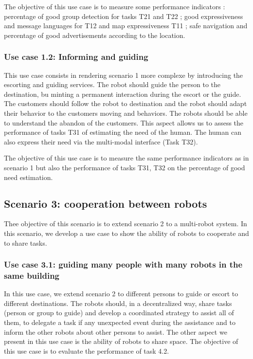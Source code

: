 The objective of this use case is to measure some performance indicators : percentage of good group detection for tasks T21 and T22 ; good expressiveness and message languages for T12 and map expressiveness T11 ; safe navigation and percentage of good advertisements according to the location. 

\subsubsection {Use case 1.2: Informing and guiding}
This use case consists in rendering scenario 1 more complexe by introducing the escorting and guiding services. The robot should guide the person to the destination, bu minting a permanent interaction during the escort or the guide. The customers should follow the robot to destination and the robot should adapt their behavior to the customers moving and behaviors.  The robots should be able to understand the abandon of the customers. This aspect allows us to assess the performance of  tasks T31 of estimating the need of the human. The human can also express their need via the multi-modal interface (Task T32).

The objective of this use case is to measure the same performance indicators as in scenario 1 but also the performance of tasks T31, T32 on the percentage of good need estimation. 

\subsection {Scenario 3: cooperation between robots}
Thee objective of this scenario is to extend scenario 2 to a multi-robot system. In this scenario, we develop a use case to show the ability of robots to cooperate and to share tasks. 
\subsubsection{Use case 3.1: guiding many people with many robots in the same building}
In this use case, we extend  scenario 2 to different persons to guide or escort to different destinations. The robots should, in a decentralized way, share tasks (person or group to guide) and develop a coordinated strategy to assist all of them, to delegate a task if any unexpected event during the assistance and to inform the other robots about other persons to assist. The other aspect we present in this use case is the ability of robots to share space. 
The objective of this use case is to evaluate the performance of task 4.2.

